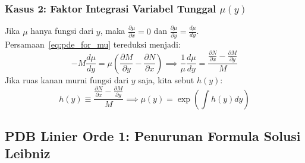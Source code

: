 \documentclass[11pt,a4paper]{article}
\theoremstyle{definition}
\begin{document}
\subsubsection{Kasus 2: Faktor Integrasi Variabel Tunggal \texorpdfstring{$\mu(y)$}{mu(y)}}
Jika $\mu$ hanya fungsi dari $y$, maka $\frac{\partial \mu}{\partial x} = 0$ dan $\frac{\partial \mu}{\partial y} = \frac{d\mu}{dy}$. Persamaan~\eqref{eq:pde_for_mu} tereduksi menjadi:
\begin{equation}
    -M \frac{d\mu}{dy} = \mu \left( \frac{\partial M}{\partial y} - \frac{\partial N}{\partial x} \right) \implies \frac{1}{\mu} \frac{d\mu}{dy} = \frac{\frac{\partial N}{\partial x} - \frac{\partial M}{\partial y}}{M}
\end{equation}
Jika ruas kanan murni fungsi dari $y$ saja, kita sebut $h(y)$:
\begin{equation}
    h(y) \equiv \frac{\frac{\partial N}{\partial x} - \frac{\partial M}{\partial y}}{M} \implies \mu(y) = \exp\left( \int h(y) dy \right)
    \label{eq:mu_y}
\end{equation}

\subsection{PDB Linier Orde 1: Penurunan Formula Solusi Leibniz}
\end{document}
